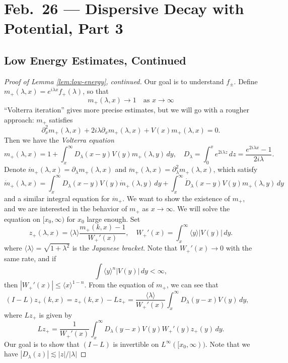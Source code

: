 \chapter{Feb.~26 --- Dispersive Decay with Potential, Part 3}

\section{Low Energy Estimates, Continued}
\begin{proof}[Proof of Lemma \ref{lem:low-energy}, continued]
  Our goal is to understand $f_\pm$. Define
  $m_+(\lambda, x) = e^{i\lambda x} f_+(\lambda)$,
  so that
  \[
    m_+(\lambda, x) \to 1 \quad \text{as $x \to \infty$}
  \]
  ``Volterra iteration'' gives more precise
  estimates, but we will go with a rougher approach:
  $m_+$ satisfies
  \[
    \partial_x^2 m_+(\lambda, x) + 2i \lambda \partial_x m_+(\lambda, x) + V(x) m_+(\lambda, x) = 0.
  \]
  Then we have the \emph{Volterra equation}
  \[
    m_+(\lambda, x) = 1 + \int_x^\infty D_\lambda(x - y) V(y) m_+(\lambda, y)\, dy, \quad
    D_\lambda = \int_0^x e^{2i\lambda z}\, dz = \frac{e^{2i\lambda x} - 1}{2 i \lambda}.
  \]
  Denote $\dot{m}_+(\lambda, x) = \partial_\lambda m_+(\lambda, x)$
  and $\ddot{m}_+(\lambda, x) = \partial_\lambda^2 m_+(\lambda, x)$,
  which satisfy
  \[
    \dot{m}_+(\lambda, x) = \int_x^\infty D_\lambda(x - y) V(y) \dot{m}_+(\lambda, y)\, dy
    + \int_x^\infty \dot{D}_\lambda(x - y) V(y) m_+(\lambda, y)\, dy
  \]
  and a similar integral equation for $\ddot{m}_+$. We
  want to
  show the existence of $m_+$, and we are interested
  in the behavior of $m_+$ as $x \to \infty$.
  We will solve the equation on $[x_0, \infty)$ for
  $x_0$ large enough. Set
  \[
    z_+(\lambda, x)
    = \langle \lambda \rangle \frac{m_+(k, x) - 1}{W_+'(x)}, \quad
    W_+'(x) = \int_x^\infty \langle y \rangle |V(y)|\, dy.
  \]
  where $\langle \lambda \rangle = \sqrt{1 + \lambda^2}$
  is the \emph{Japanese bracket}.
  Note that $W_+'(x) \to 0$ with the same rate, and if
  \[
    \int \langle y \rangle^n |V(y)|\, dy < \infty,
  \]
  then $|W_+'(x)| \le \langle x \rangle^{1 - n}$.
  From the equation of $m_+$, we can see that
  \[
    (I - L) z_+(k, x) = z_+(k, x) - L z_+
    = \frac{\langle \lambda \rangle}{W_+'(x)} \int_x^\infty D_\lambda(y - x) V(y)\, dy, \quad
  \]
  where $Lz_+$ is given by
  \[
    L z_+ = \frac{1}{W_+'(x)} \int_x^\infty D_\lambda(y - x) V(y) W_+'(y) z_+(y) \, dy.
  \]
  Our goal is to show that $(I - L)$ is invertible
  on $L^\infty([x_0, \infty))$.
  Note that we have
  $|D_\lambda(z)| \lesssim |z| / |\lambda|$

\end{proof}

